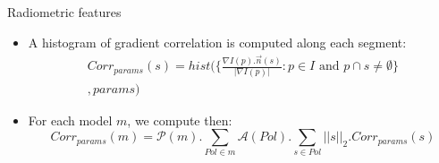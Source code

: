 \documentclass{beamer}
\begin{document}
            \begin{frame}{Radiometric features}
                \begin{itemize}[label=$\blacktriangleright$, font=\color{IGNGreen}]
                    \item<1-> A histogram of gradient correlation is computed along each segment:
                    \begin{multline}
                        Corr_{params}(s) = hist \Bigg( \Big\{\frac{\nabla I(p) . \vec{n}(s)}{\vert\nabla I(p)\vert}: p \in I \text{ and } p \cap s \neq \emptyset \Big\}\\
                        , params\Bigg)
                    \end{multline}
                    \item<2-> For each model $m$, we compute then:
                    \begin{equation}
                        Corr_{params}(m) = \mathscr{P}(m) . \sum_{Pol \in m} \mathscr{A}(Pol). \sum_{s \in Pol} \vert\vert s \vert\vert_2. Corr_{params}(s)
                    \end{equation}
                \end{itemize}
            \end{frame}
\end{document}
